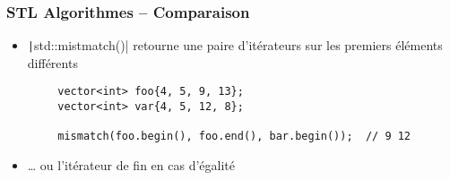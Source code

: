 \documentclass[C++.tex]{subfiles}
\begin{document}
\begin{frame}[fragile]
	\frametitle{STL Algorithmes -- Comparaison}
	\begin{itemize}
		\item \texttt|std::mistmatch()| retourne une paire d'itérateurs sur les premiers éléments différents
	\end{itemize}

	\begin{verbatim}
		vector<int> foo{4, 5, 9, 13};
		vector<int> var{4, 5, 12, 8};

		mismatch(foo.begin(), foo.end(), bar.begin());  // 9 12
	\end{verbatim}

	\begin{itemize}
		\item \ldots{} ou l'itérateur de fin en cas d'égalité
	\end{itemize}

\end{frame}
\end{document}
